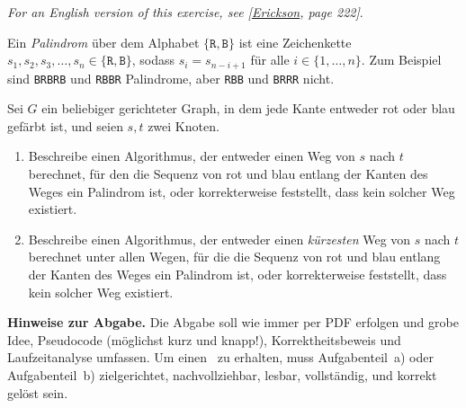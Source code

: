 \documentclass{uebung_cs}
\begin{document}
\textit{\footnotesize For an English version of this exercise, see [\href{https://jeffe.cs.illinois.edu/teaching/algorithms/book/Algorithms-JeffE.pdf}{Erickson}, page 222]}.

Ein \emph{Palindrom} über dem Alphabet $\{\texttt{R},\texttt{B}\}$ ist eine Zeichenkette $s_1,s_2,s_3,\dots,s_n\in\{\texttt{R},\texttt{B}\}$, sodass $s_i=s_{n-i+1}$ für alle $i\in\{1,\dots,n\}$. Zum Beispiel sind \texttt{BRBRB} und \texttt{RBBR} Palindrome, aber \texttt{RBB} und \texttt{BRRR} nicht.

Sei $G$ ein beliebiger gerichteter Graph, in dem jede Kante entweder rot oder blau gefärbt ist, und seien $s,t$ zwei Knoten.
\begin{enumerate}
    \item Beschreibe einen Algorithmus, der entweder einen Weg von $s$ nach $t$ berechnet, für den die Sequenz von rot und blau entlang der Kanten des Weges ein Palindrom ist, oder korrekterweise feststellt, dass kein solcher Weg existiert.
    \item Beschreibe einen Algorithmus, der entweder einen \emph{kürzesten} Weg von $s$ nach $t$ berechnet unter allen Wegen, für die die Sequenz von rot und blau entlang der Kanten des Weges ein Palindrom ist, oder korrekterweise feststellt, dass kein solcher Weg existiert.
\end{enumerate}

\textbf{Hinweise zur Abgabe.}
Die Abgabe soll wie immer per PDF erfolgen und grobe Idee, Pseudocode (möglichst kurz und knapp!), Korrektheitsbeweis und Laufzeitanalyse umfassen. Um einen~ zu erhalten, muss Aufgabenteil~a) oder Aufgabenteil~b) zielgerichtet, nachvollziehbar, lesbar, vollständig, und korrekt gelöst sein.


\end{document}
